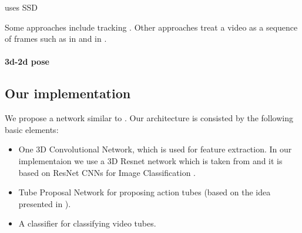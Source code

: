 \documentclass{report}
\begin{document}
\cite{DBLP:journals/corr/SinghSC16} uses SSD 

Some approaches include tracking \cite{DBLP:journals/corr/WeinzaepfelHS15}.
Other approaches treat a video as a sequence of frames such as in \cite{DBLP:journals/corr/KalogeitonWFS17} and in \cite{DBLP:journals/corr/HouCS17}.

\paragraph{3d-2d pose}







\subsection{Our implementation}
We propose a network similar to \cite{DBLP:journals/corr/HouCS17}. Our architecture is consisted by the following basic elements:
\begin{itemize}
\item One 3D Convolutional Network, which is used for feature extraction. In our implementaion we use a 3D Resnet network which is taken from
  \cite{hara3dcnns} and it is based on ResNet CNNs for Image Classification \cite{DBLP:journals/corr/HeZRS15}.
\item Tube Proposal Network for proposing action tubes (based on the idea presented in \cite{DBLP:journals/corr/HouCS17}).
\item A classifier for classifying video tubes.
\end{itemize}
  



\end{document}
